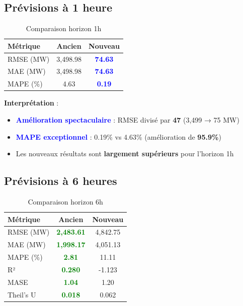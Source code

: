 \documentclass[12pt,a4paper]{article}
\begin{document}
\subsection{Prévisions à 1 heure}

\begin{table}[h]
\centering
\caption{Comparaison horizon 1h}
\label{tab:h1}
\begin{tabular}{lcc}
\toprule
\textbf{Métrique} & \textbf{Ancien} & \textbf{Nouveau} \\
\midrule
RMSE (MW) & 3,498.98 & \textcolor{blue}{\textbf{74.63}} \\
MAE (MW) & 3,498.98 & \textcolor{blue}{\textbf{74.63}} \\
MAPE (\%) & 4.63 & \textcolor{blue}{\textbf{0.19}} \\
\bottomrule
\end{tabular}
\end{table}

\textbf{Interprétation} :
\begin{itemize}
    \item \textcolor{blue}{\textbf{Amélioration spectaculaire}} : RMSE divisé par \textbf{47} (3,499 → 75 MW)
    \item \textcolor{blue}{\textbf{MAPE exceptionnel}} : 0.19\% vs 4.63\% (amélioration de \textbf{95.9\%})
    \item Les nouveaux résultats sont \textbf{largement supérieurs} pour l'horizon 1h
\end{itemize}

\subsection{Prévisions à 6 heures}

\begin{table}[h]
\centering
\caption{Comparaison horizon 6h}
\label{tab:h6}
\begin{tabular}{lcc}
\toprule
\textbf{Métrique} & \textbf{Ancien} & \textbf{Nouveau} \\
\midrule
RMSE (MW) & \textcolor{green}{\textbf{2,483.61}} & 4,842.75 \\
MAE (MW) & \textcolor{green}{\textbf{1,998.17}} & 4,051.13 \\
MAPE (\%) & \textcolor{green}{\textbf{2.81}} & 11.11 \\
R² & \textcolor{green}{\textbf{0.280}} & -1.123 \\
MASE & \textcolor{green}{\textbf{1.04}} & 1.20 \\
Theil's U & \textcolor{green}{\textbf{0.018}} & 0.062 \\
\bottomrule
\end{tabular}
\end{table}
\end{document}
